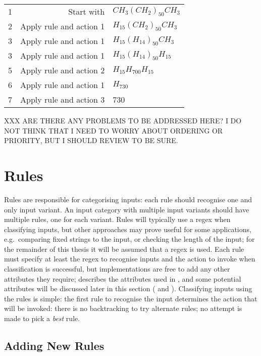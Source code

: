 \begin{tabular}{lrl}

    1 & Start with              & $CH_{3}{(CH_{2})}_{50}CH_{3}$ \\
    2 & Apply rule and action 1 & $H_{15}{(CH_{2})}_{50}CH_{3}$ \\
    3 & Apply rule and action 1 & $H_{15}{(H_{14})}_{50}CH_{3}$ \\
    3 & Apply rule and action 1 & $H_{15}{(H_{14})}_{50}H_{15}$ \\
    5 & Apply rule and action 2 & $H_{15}H_{700}H_{15}$ \\
    6 & Apply rule and action 1 & $H_{730}$ \\
    7 & Apply rule and action 3 & 730 \\

\end{tabular}

XXX ARE THERE ANY PROBLEMS TO BE ADDRESSED HERE\@?  I DO NOT THINK THAT I
NEED TO WORRY ABOUT ORDERING OR PRIORITY, BUT I SHOULD REVIEW TO BE SURE\@.

\section{Rules}

\label{rules in architecture}

Rules are responsible for categorising inputs: each rule should recognise
one and only input variant.  An input category with multiple input variants
should have multiple rules, one for each variant.  Rules will typically use
a regex when classifying inputs, but other approaches may prove useful for
some applications, e.g.\ comparing fixed strings to the input, or checking
the length of the input; for the remainder of this thesis it will be
assumed that a regex is used.  Each rule must specify at least the regex to
recognise inputs and the action to invoke when classification is
successful, but implementations are free to add any other attributes they
require;  describes the attributes used in
\parsername{}, and some potential attributes will be discussed later in
this section ( and
).  Classifying inputs using
the rules is simple: the first rule to recognise the input determines the
action that will be invoked: there is no backtracking to try alternate
rules; no attempt is made to pick a \textit{best\/} rule.

\subsection{Adding New Rules}


